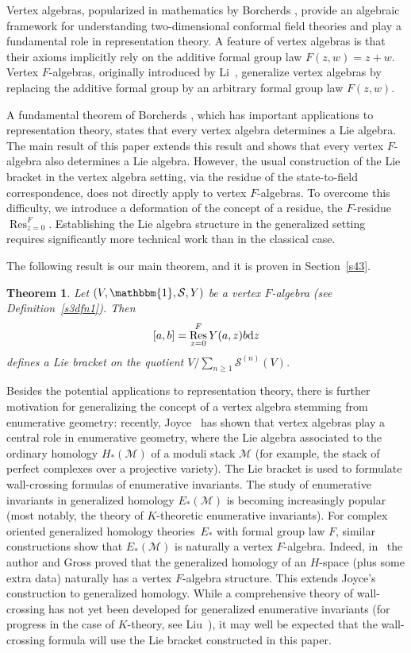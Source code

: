 \documentclass[pdftex]{sigma}
\numberwithin{equation}{section}
\newtheorem*{Theorem*}{Theorem}
\theoremstyle{definition}
\DeclareMathOperator\Res{Res}
\begin{document}
Vertex algebras, popularized in mathematics by Borcherds \cite{Borc}, provide an algebraic framework for understanding two-dimensional conformal field theories and play a fundamental role in representation theory. A feature of vertex algebras is that their axioms implicitly rely on the additive formal group law $F(z,w)=z+w$. Vertex $F$-algebras, originally introduced by Li~\cite{Li}, generalize vertex algebras by replacing the additive formal group by an arbitrary formal group law $F(z,w)$.

A fundamental theorem of Borcherds \cite{Borc}, which has important applications to representation theory, states that every vertex algebra determines a Lie algebra. The main result of this paper extends this result and shows that every vertex $F$-algebra also determines a Lie algebra. However, the usual construction of the Lie bracket in the vertex algebra setting, via the residue of the state-to-field correspondence, does not directly apply to vertex $F$-algebras. To overcome this difficulty, we introduce a deformation of the concept of a residue, the $F$-residue $\Res_{z=0}^F$. Establishing the Lie algebra structure in the generalized setting requires significantly more technical work than in the classical case.

The following result is our main theorem, and it is proven in Section~\ref{s43}.

\begin{Theorem*}
Let $(V,\mathbbm{1},\mathcal{S},Y)$ be a vertex $F$-algebra \textup(see Definition~\textup{\ref{s3dfn1}}\textup). Then
\[
 [a,b] = \Res_{z=0}^F Y(a,z)b {\rm d}z
\]
defines a Lie bracket on the quotient $V/\sum_{n\geqslant1}\mathcal{S}^{(n)}(V)$.
\end{Theorem*}

Besides the potential applications to representation theory, there is further motivation for generalizing the concept of a vertex algebra stemming from enumerative geometry: recently, Joyce~\cite{Joy2,Joy} has shown that vertex algebras play a central role in enumerative geometry, where the Lie algebra associated to the ordinary homology $H_*(\mathcal{M})$ of a moduli stack $\mathcal{M}$ (for example, the stack of perfect complexes over a projective variety). The Lie bracket is used to formulate wall-crossing formulas of enumerative invariants. The study of enumerative invariants in generalized homology $E_*(\mathcal{M})$ is becoming increasingly popular (most notably, the theory of $K$-theoretic enumerative invariants). For complex oriented generalized homology theories~$E_*$ with formal group law $F$, similar constructions show that $E_*(\mathcal{M})$ is naturally a vertex $F$-algebra. Indeed, in~\cite{GroUp} the author and Gross proved that the generalized homology of an $H$-space (plus some extra data) naturally has a vertex $F$-algebra structure. This extends Joyce's construction to generalized homology. While a comprehensive theory of wall-crossing has not yet been developed for generalized enumerative invariants (for progress in the case of $K$-theory, see Liu~\cite{Liu}), it may well be expected that the wall-crossing formula will use the Lie bracket constructed in this paper.
\end{document}
